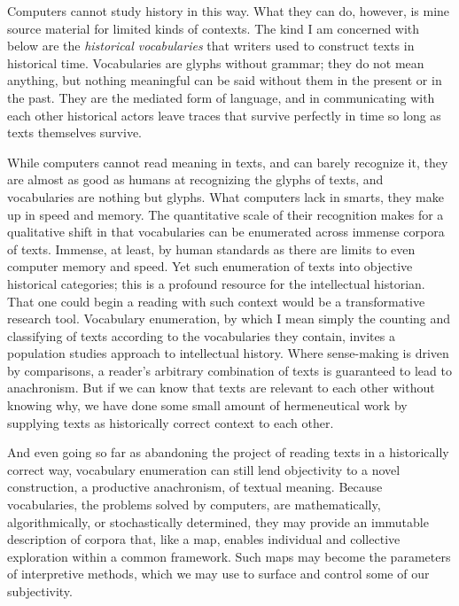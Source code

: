 \documentclass[]{book}
\begin{document}
Computers cannot study history in this way. What they can do, however,
is mine source material for limited kinds of contexts. The kind I am
concerned with below are the \emph{historical vocabularies} that writers
used to construct texts in historical time. Vocabularies are glyphs
without grammar; they do not mean anything, but nothing meaningful can
be said without them in the present or in the past. They are the
mediated form of language, and in communicating with each other
historical actors leave traces that survive perfectly in time so long as
texts themselves survive.

While computers cannot read meaning in texts, and can barely recognize
it, they are almost as good as humans at recognizing the glyphs of
texts, and vocabularies are nothing but glyphs. What computers lack in
smarts, they make up in speed and memory. The quantitative scale of
their recognition makes for a qualitative shift in that vocabularies can
be enumerated across immense corpora of texts. Immense, at least, by
human standards as there are limits to even computer memory and speed.
Yet such enumeration of texts into objective historical categories; this
is a profound resource for the intellectual historian. That one could
begin a reading with such context would be a transformative research
tool. Vocabulary enumeration, by which I mean simply the counting and
classifying of texts according to the vocabularies they contain, invites
a population studies approach to intellectual history. Where
sense-making is driven by comparisons, a reader's arbitrary combination
of texts is guaranteed to lead to anachronism. But if we can know that
texts are relevant to each other without knowing why, we have done some
small amount of hermeneutical work by supplying texts as historically
correct context to each other.

And even going so far as abandoning the project of reading texts in a
historically correct way, vocabulary enumeration can still lend
objectivity to a novel construction, a productive anachronism, of
textual meaning. Because vocabularies, the problems solved by computers,
are mathematically, algorithmically, or stochastically determined, they
may provide an immutable description of corpora that, like a map,
enables individual and collective exploration within a common framework.
Such maps may become the parameters of interpretive methods, which we
may use to surface and control some of our subjectivity.
\end{document}
